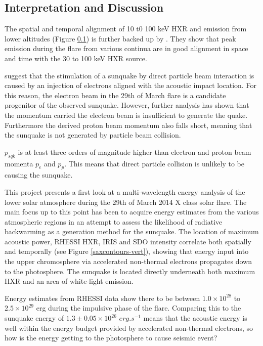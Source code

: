 \subsection{Interpretation and Discussion}

The spatial and temporal alignment of 10 t0 100 keV HXR and emission from lower altitudes (Figure \ref{}) is further backed up by \cite{}. They show that peak emission during the flare from various continua are in good alignment in space and time with the 30 to 100 keV HXR source.  

\cite{} suggest that the stimulation of a sunquake by direct particle beam interaction is caused by an injection of electrons aligned with the acoustic impact location. For this reason, the electron beam in the 29th of March flare is a candidate progenitor of the observed sunquake. However, further analysis has shown that the momentum carried the electron beam is insufficient to generate the quake. Furthermore the derived proton beam momentum also falls short, meaning that the sunquake is not generated by particle beam collision.    



$p_{sqk}$ is at least three orders of magnitude higher than electron and proton beam momenta $p_e$ and $p_p$. This means that direct particle collision is unlikely to be causing the sunquake. 










This project presents a first look at a multi-wavelength energy analysis of the lower solar atmosphere during the 29th of March 2014 X class solar flare. The main focus up to this point has been to acquire energy estimates from the various atmospheric regions in an attempt to assess the likelihood of radiative backwarming as a generation method for the sunquake. The location of maximum acoustic power, RHESSI HXR, IRIS and SDO intensity correlate both spatially and temporally (see Figure \ref{saxcontours-vert}), showing that energy input into the upper chromosphere via accelerated non-thermal electrons propagates down to the photosphere. The sunquake is located directly underneath both maximum HXR and an area of white-light emission.

Energy estimates from RHESSI data show there to be between $1.0{\times}10^{28}$ to $2.5{\times}10^{29}$ erg during the impulsive phase of the flare. Comparing this to the sunquake energy of $1.3\pm0.05{\times}10^{26}$ $erg.s^{-1}$ means that the acoustic energy is well within the energy budget provided by accelerated non-thermal electrons, so how is the energy getting to the photosphere to cause seismic event?

